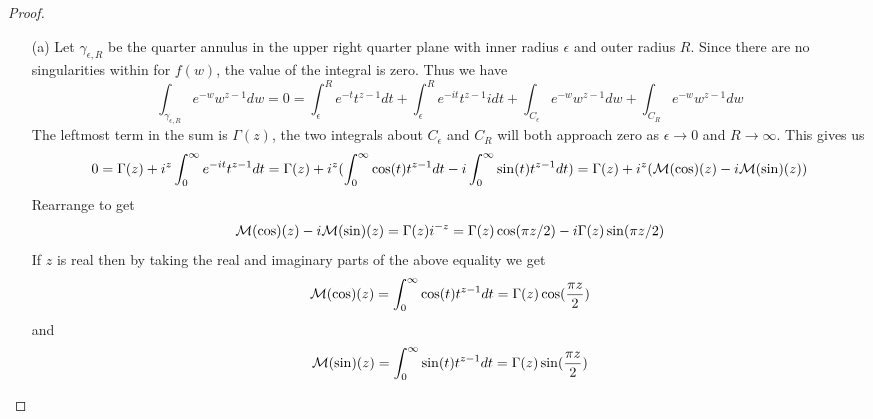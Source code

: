 \documentclass[10pt]{article}
\theoremstyle{plain}
\theoremstyle{remark}
\begin{document}
\begin{proof}
  \begin{enumerate}
  \item[(a)] Let $\gamma_{\epsilon,R}$ be the quarter annulus in the upper right quarter
    plane with inner radius $\epsilon$ and outer radius $R$. Since there are no
    singularities within for $f(w)$, the value of the integral is zero. Thus we have
    \[
      \int_{\gamma_{\epsilon,R}}e^{-w}w^{z-1}dw = 0 = \int_\epsilon^R e^{-t}t^{z-1}dt + \int_\epsilon^R e^{-it}t^{z-1}idt+\int_{C_\epsilon}e^{-w}w^{z-1}dw+\int_{C_R}e^{-w}w^{z-1}dw
    \]
    The leftmost term in the sum is $\Gamma(z)$, the two integrals about $C_\epsilon$ and $C_R$
    will both approach zero as $\epsilon\rightarrow 0$ and $R\rightarrow \infty$. This gives us
    \[
      0 = \Gamma(z)+i^z\int_0^\infty e^{-it}t^{z-1}dt=\Gamma(z)+i^z(\int_0^\infty\cos(t)t^{z-1}dt-i\int_0^\infty\sin(t)t^{z-1}dt)=\Gamma(z)+i^z({\cal M}(\cos)(z)-i{\cal M}(\sin)(z))
    \]
    Rearrange to get
    \[
      {\cal M}(\cos)(z)-i{\cal M}(\sin)(z)= \Gamma(z)i^{-z}=\Gamma(z)\cos(\pi z/2)-i\Gamma(z)\sin(\pi z/2)
    \]
    If $z$ is real then by taking the real and imaginary parts of the above
    equality we get
    \[
      {\cal M}(\cos)(z)=\int_0^\infty\cos(t)t^{z-1}dt=\Gamma(z)\cos(\frac{\pi z}{2})
    \]
    and
    \[
      {\cal M}(\sin)(z)=\int_0^\infty\sin(t)t^{z-1}dt=\Gamma(z)\sin(\frac{\pi z}{2})
    \]


\end{enumerate}
\end{proof}
\end{document}
